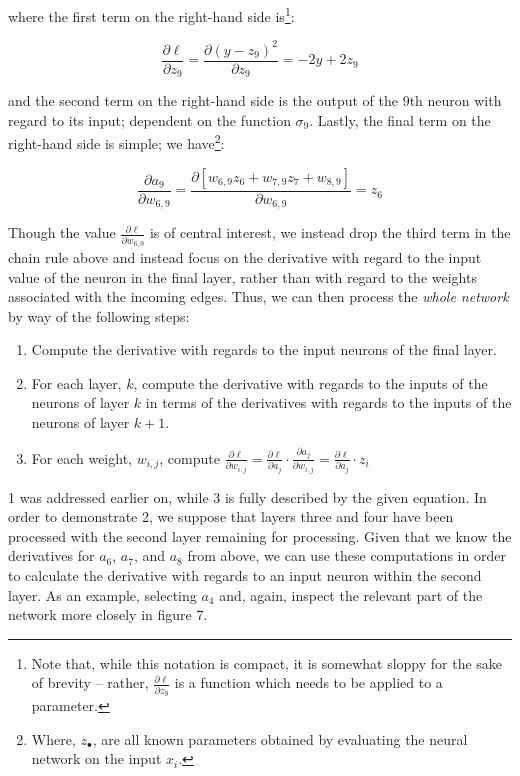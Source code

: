 \documentclass[11pt]{article}
\begin{document}
where the first term on the right-hand side is\footnote{Note that, while this notation is compact, it is somewhat sloppy for the sake of brevity – rather, $\frac{\partial \ell}{\partial z_{9}}$ is a function which needs to be applied to a parameter.}:

\begin{equation}\frac{\partial\ell }{\partial z_{9}} = \frac{\partial (y-z_{9})^{2} }{\partial z_{9}} = - 2y+2z_{9}\nonumber\end{equation}

and the second term on the right-hand side is the output of the 9th neuron with regard to its input; dependent on the function $\sigma_{9}$. Lastly, the final term on the right-hand side is simple; we have\footnote{Where, $z_{\bullet}$, are all known parameters obtained by evaluating the neural network on the input $x_{i}$.}: 

\begin{equation}\frac{\partial a_{9}}{\partial w_{6, 9}} = \frac{\partial [w_{6,9}z_{6}+w_{7,9}z_{7}+w_{8,9}]}{\partial w_{6,9}} =z_{6} \nonumber\end{equation}

Though the value $\frac{\partial\ell }{\partial w_{6,9}}$ is of central interest, we instead drop the third term in the chain rule above and instead focus on the derivative with regard to the input value of the neuron in the final layer, rather than with regard to the weights associated with the incoming edges. Thus, we can then process the \textit{whole network} by way of the following steps:

\begin{enumerate}
  \item Compute the derivative with regards to the input neurons of the final layer.
  \item For each layer, $k$, compute the derivative with regards to the inputs of the neurons of layer $k$ in terms of the derivatives with regards to the inputs of the neurons of layer $k+1$.
  \item For each weight, $w_{i,j}$, compute $\frac{\partial\ell }{\partial w_{i,j}} = \frac{\partial\ell }{\partial a_{j}} \cdot \frac{\partial a_{j} }{\partial w_{i,j}} = \frac{\partial \ell }{\partial a_{j}} \cdot z_{i}$
\end{enumerate}

1 was addressed earlier on, while 3 is fully described by the given equation. In order to demonstrate 2, we suppose that layers three and four have been processed with the second layer remaining for processing. Given that we know the derivatives for $a_{6}$, $a_{7}$, and $a_{8}$ from above, we can use these computations in order to calculate the derivative with regards to an input neuron within the second layer. As an example, selecting $a_{4}$ and, again, inspect the relevant part of the network more closely in figure 7.
\end{document}
